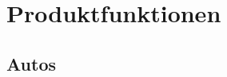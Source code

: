 \documentclass[pflichtenheft.tex]{subfiles}
\begin{document}
\chapter{Produktfunktionen}

\section{Autos}
\end{document}
